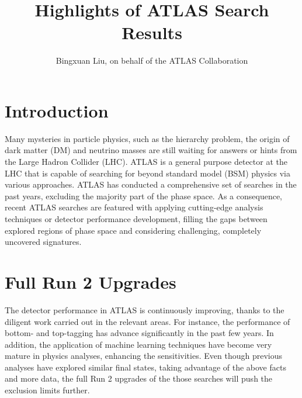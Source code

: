 \documentclass{moriond}
\begin{document}
\title{Highlights of ATLAS Search Results}

\author{Bingxuan Liu, on behalf of the ATLAS Collaboration}

\address{Department of Physics, Simon Fraser University, Vancouver, Canada}

\maketitle{}  

\section{Introduction}

Many mysteries in particle physics, such as the hierarchy problem, the origin
of dark matter (DM) and neutrino masses are still waiting for answers or hints
from the Large Hadron Collider (LHC). ATLAS is a general purpose detector at
the LHC that is capable of searching for beyond standard model (BSM) physics
via various approaches. ATLAS has conducted a comprehensive set of searches in
the past years, excluding the majority part of the phase space. As a
consequence, recent ATLAS searches are featured with applying cutting-edge
analysis techniques or detector performance development, filling the gaps
between explored regions of phase space and considering challenging, completely
uncovered signatures.      

\section{Full Run 2 Upgrades}

The detector performance in ATLAS is continuously improving, thanks to the
diligent work carried out in the relevant areas. For instance, the performance
of bottom- and top-tagging has advance significantly in the past few years. In
addition, the application of machine learning techniques have become very
mature in physics analyses, enhancing the sensitivities. Even though previous
analyses have explored similar final states, taking advantage of the above
facts and more data, the full Run 2 upgrades of the those searches will push
the exclusion limits further.\\
\end{document}
